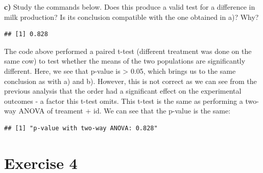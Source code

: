 \documentclass[
  10pt,
]{article}
\newenvironment{Shaded}{\begin{snugshade}}{\end{snugshade}}
\newcommand{\AttributeTok}[1]{\textcolor[rgb]{0.77,0.63,0.00}{#1}}
\newcommand{\ConstantTok}[1]{\textcolor[rgb]{0.00,0.00,0.00}{#1}}
\newcommand{\DecValTok}[1]{\textcolor[rgb]{0.00,0.00,0.81}{#1}}
\newcommand{\FunctionTok}[1]{\textcolor[rgb]{0.00,0.00,0.00}{#1}}
\newcommand{\NormalTok}[1]{#1}
\newcommand{\SpecialCharTok}[1]{\textcolor[rgb]{0.00,0.00,0.00}{#1}}
\newcommand{\StringTok}[1]{\textcolor[rgb]{0.31,0.60,0.02}{#1}}
\begin{document}
\textbf{c)} Study the commands below. Does this produce a valid test for
a difference in milk production? Is its conclusion compatible with the
one obtained in a)? Why?

\begin{Shaded}
\end{Shaded}

\begin{verbatim}
## [1] 0.828
\end{verbatim}

The code above performed a paired t-test (different treatment was done
on the same cow) to test whether the means of the two populations are
significantly different. Here, we see that p-value is \textgreater{}
0.05, which brings us to the same conclusion as with a) and b). However,
this is not correct as we can see from the previous analysis that the
order had a significant effect on the experimental outcomes - a factor
this t-test omits. This t-test is the same as performing a two-way ANOVA
of treament + id. We can see that the p-value is the same:

\begin{Shaded}
\end{Shaded}

\begin{verbatim}
## [1] "p-value with two-way ANOVA: 0.828"
\end{verbatim}

\hypertarget{exercise-4}{%
\section{Exercise 4}\label{exercise-4}}
\end{document}
